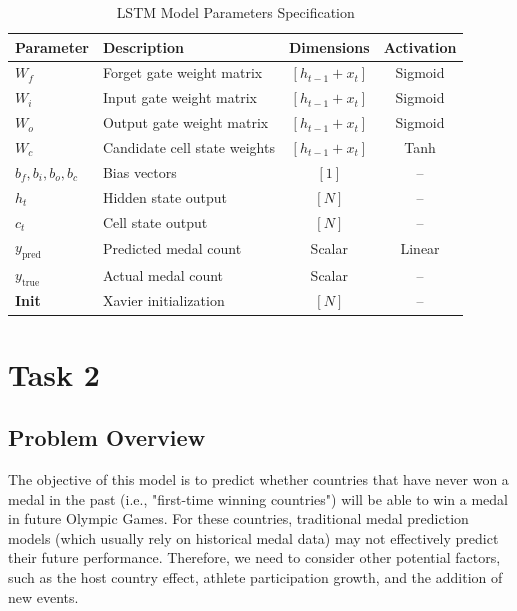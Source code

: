 \documentclass{mcmthesis}
\begin{document}
\begin{table}[ht]
	\centering
	\caption{LSTM Model Parameters Specification}
	\label{tab:lstm_params}
	\renewcommand{\arraystretch}{1}
	\small
	\begin{tabularx}{\textwidth}{lYcc}
		\toprule
		\textbf{Parameter} & \textbf{Description} & \textbf{Dimensions} & \textbf{Activation} \\
		\midrule
		
		$W_f$ & Forget gate weight matrix & $[h_{t-1}+x_t]$ & Sigmoid \\
		$W_i$ & Input gate weight matrix & $[h_{t-1}+x_t]$ & Sigmoid \\
		$W_o$ & Output gate weight matrix & $[h_{t-1}+x_t]$ & Sigmoid \\
		$W_c$ & Candidate cell state weights & $[h_{t-1}+x_t]$ & Tanh \\
		$b_f, b_i, b_o, b_c$ & Bias vectors & $[1]$ & -- \\
		$h_t$ & Hidden state output & $[N]$ & -- \\
		$c_t$ & Cell state output & $[N]$ & -- \\
		$y_{\text{pred}}$ & Predicted medal count & Scalar & Linear \\
		$y_{\text{true}}$ & Actual medal count & Scalar & -- \\
		\textbf{Init} & Xavier initialization & $[N]$ & -- \\
		\bottomrule
	\end{tabularx}
\end{table}

	
	
	\section{Task 2}
	
	
	\subsection{Problem Overview}
	The objective of this model is to predict whether countries that have never won a medal in the past (i.e., "first-time winning countries") will be able to win a medal in future Olympic Games. For these countries, traditional medal prediction models (which usually rely on historical medal data) may not effectively predict their future performance. Therefore, we need to consider other potential factors, such as the host country effect, athlete participation growth, and the addition of new events.
	
\end{document}
